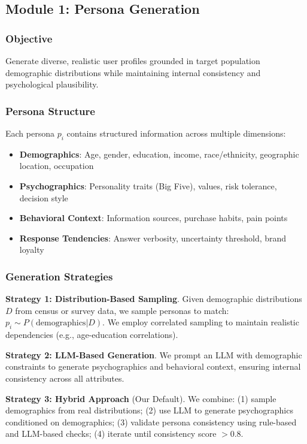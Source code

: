 \documentclass[sigconf,nonarchival]{acmart}
\begin{document}
\subsection{Module 1: Persona Generation}

\subsubsection{Objective}

Generate diverse, realistic user profiles grounded in target population demographic distributions while maintaining internal consistency and psychological plausibility.

\subsubsection{Persona Structure}

Each persona $p_i$ contains structured information across multiple dimensions:

\begin{itemize}
\item \textbf{Demographics}: Age, gender, education, income, race/ethnicity, geographic location, occupation
\item \textbf{Psychographics}: Personality traits (Big Five), values, risk tolerance, decision style
\item \textbf{Behavioral Context}: Information sources, purchase habits, pain points
\item \textbf{Response Tendencies}: Answer verbosity, uncertainty threshold, brand loyalty
\end{itemize}

\subsubsection{Generation Strategies}

\textbf{Strategy 1: Distribution-Based Sampling}. Given demographic distributions $D$ from census or survey data, we sample personas to match: $p_i \sim P(\text{demographics} | D)$. We employ correlated sampling to maintain realistic dependencies (e.g., age-education correlations).

\textbf{Strategy 2: LLM-Based Generation}. We prompt an LLM with demographic constraints to generate psychographics and behavioral context, ensuring internal consistency across all attributes.

\textbf{Strategy 3: Hybrid Approach} (Our Default). We combine: (1) sample demographics from real distributions; (2) use LLM to generate psychographics conditioned on demographics; (3) validate persona consistency using rule-based and LLM-based checks; (4) iterate until consistency score $> 0.8$.
\end{document}
